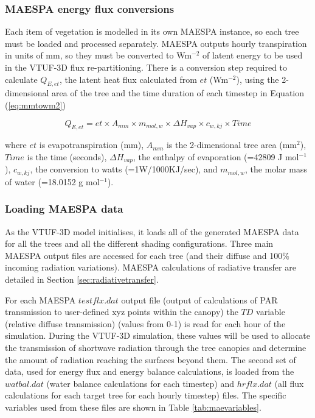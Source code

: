 \documentclass[preprint,12pt,authoryear]{elsarticle}
\begin{document}
\subsubsection{MAESPA energy flux conversions}\label{sec:maeflxconv}
Each item of vegetation is modelled in its own MAESPA instance, so each tree must be loaded and processed separately. MAESPA outputs hourly transpiration in units of mm, so they must be converted to Wm$^{-2}$ of latent energy to be used in the VTUF-3D flux re-partitioning. There is a conversion step required to calculate $Q_{E,et}$, the latent heat flux calculated from $et$ (Wm$^{-2}$), using the 2-dimensional area of the tree and the time duration of each timestep in Equation (\ref{eq:mmtowm2})

\begin{equation}\label{eq:mmtowm2} 
  Q_{E,et} = et \times A _{mm} \times m_{mol,w} \times \Delta H_{vap} \times c_{w,kj} \times Time  
\end{equation} 
 
where 
$et$ is evapotranspiration (mm), 
$A _{mm}$ is the 2-dimensional tree area (mm$^{2}$), 
$Time$ is the time (seconds), 
$\Delta H_{vap}$, the enthalpy of evaporation (=42809 J mol$^{-1}$), 
$c_{w,kj}$, the conversion to watts (=1W/1000KJ/sec), and 
$m_{mol,w}$, the molar mass of water (=18.0152 g mol$^{-1}$).




\subsubsection{Loading MAESPA data}\label{sec:loadingmaedata}

As the VTUF-3D model initialises, it loads all of the generated MAESPA data for all the trees and all the different shading configurations. Three main MAESPA output files are accessed for each tree (and their diffuse and 100\% incoming radiation variations). MAESPA calculations of radiative transfer are detailed in Section \ref{sec:radiativetransfer}.

For each MAESPA $testflx.dat$ output file (output of calculations of PAR transmission to user-defined xyz points within the canopy) the $TD$ variable (relative diffuse transmission) (values from 0-1) is read for each hour of the simulation. During the VTUF-3D simulation, these values will be used to allocate the transmission of shortwave radiation through the tree canopies and determine the amount of radiation reaching the surfaces beyond them. The second set of data, used for energy flux and energy balance calculations, is loaded from the $watbal.dat$ (water balance calculations for each timestep) and $hrflx.dat$ (all flux calculations for each target tree for each hourly timestep) files. The specific variables used from these files are shown in Table \ref{tab:maevariables}.
\end{document}
